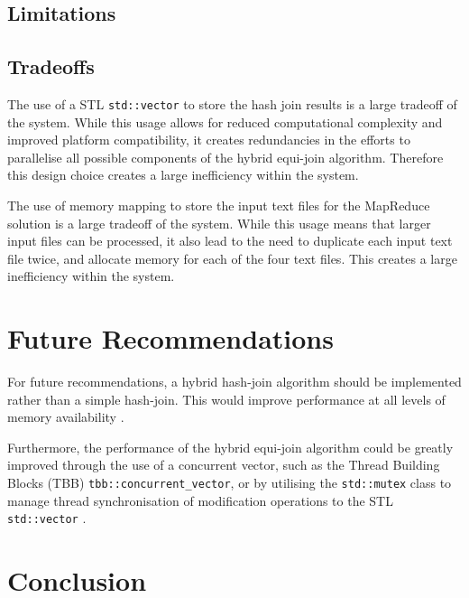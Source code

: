 \documentclass[10pt,twocolumn]{witseiepaper}
\begin{document}
\subsection{Limitations}

\subsection{Tradeoffs} \label{sec:tradeoffs}
The use of a STL \texttt{std::vector} to store the hash join results is a large tradeoff of the system. While this usage allows for reduced computational complexity and improved platform compatibility, it creates redundancies in the efforts to parallelise all possible components of the hybrid equi-join algorithm. Therefore this design choice creates a large inefficiency within the system.

The use of memory mapping to store the input text files for the MapReduce solution is a large tradeoff of the system. While this usage means that larger input files can be processed, it also lead to the need to duplicate each input text file twice, and allocate memory for each of the four text files. This creates a large inefficiency within the system.

\section{Future Recommendations}
For future recommendations, a hybrid hash-join algorithm should be implemented rather than a simple hash-join. This would improve performance at all levels of memory availability \cite{evaluating4JoinAlgorithms}.

Furthermore, the performance of the hybrid equi-join algorithm could be greatly improved through the use of a concurrent vector, such as the Thread Building Blocks (TBB) \texttt{tbb::concurrent\_vector}, or by utilising the \texttt{std::mutex} class to manage thread synchronisation of modification operations to the STL \texttt{std::vector} \cite{tbb} \cite{mutex}.

\section{Conclusion}



\end{document}
